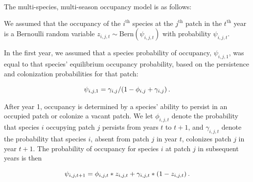 \documentclass{article}\usepackage[]{graphicx}\usepackage[]{color}
\begin{document}
The multi-species, multi-season occupancy model is as follows: 

We
assumed that the occupancy of the $i^{\mathrm{th}}$ species at the
$j^{\mathrm{th}}$ patch in the $t^{\mathrm{th}}$ year is a Bernoulli random variable $z_{i,j,t} \sim \mathrm{Bern}(\psi_{i,j,t})$ with
probability $\psi_{i,j,t}$.

In the first year, we assumed that a species probability of occupancy,
$\psi_{i,j,1}$, was equal to that species' equilibrium occupancy
probability, based on the persistence and colonization probabilities
for that patch:

%
\begin{equation}
\label{eq:occupancy2}
\psi_{i,j,1} = \gamma_{i,j}/(1-\phi_{i,j} + \gamma_{i,j}) \hspace{0.2em}.
\end{equation}
%


After year 1, occupancy is determined by a
species' ability to persist in an occupied patch or colonize a vacant patch.  We let $\phi_{i,j,t}$ denote the probability that
species $i$ occupying patch $j$ persists from years $t$ to $t+1$, and
$\gamma_{i,j,t}$ denote the probability that species $i$, absent from
patch $j$ in year $t$, colonizes patch $j$ in year $t+1$.  The probability of occupancy for species $i$ at patch $j$ in
subsequent years is then

%
\begin{equation}
\label{eq:occupancy1}
\psi_{i,j,t+1} =
\phi_{i,j,t} * z_{i,j,t} + \gamma_{i,j,t} * (1-z_{i,j,t})\hspace{0.2em}.
\end{equation}
%
\end{document}
